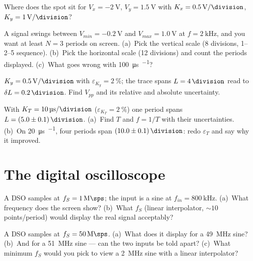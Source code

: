 \documentclass[11pt,a4paper,oneside]{book}
\begin{document}
\begin{exercise}
Where does the spot sit for $V_x=\qty{-2}{\volt}$, $V_y=\qty{1.5}{\volt}$ with
$K_x=\qty{0.5}{\volt\per\division}$, $K_y=\qty{1}{\volt\per\division}$?
\end{exercise}

\begin{exercise}
A signal swings between $V_{min}=\qty{-0.2}{\volt}$ and $V_{max}=\qty{1.0}{\volt}$
at $f=\qty{2}{\kilo\hertz}$, and you want at least $N=3$ periods on screen.
(a)~Pick the vertical scale (8 divisions, 1--2--5 sequence).
(b)~Pick the horizontal scale (12 divisions) and count the periods displayed.
(c)~What goes wrong with \qty{100}{\micro\second\per\division}?
\end{exercise}

\begin{exercise}
$K_y=\qty{0.5}{\volt\per\division}$ with $\varepsilon_{K_y}=\qty{2}{\percent}$;
the trace spans $L=\qty{4}{\division}$ read to $\delta L=\qty{0.2}{\division}$.
Find $V_{pp}$ and its relative and absolute uncertainty.
\end{exercise}

\begin{exercise}
With $K_T=\qty{10}{\micro\second\per\division}$
($\varepsilon_{K_T}=\qty{2}{\percent}$) one period spans
$L=(5.0\pm0.1)\,\unit{\division}$.
(a)~Find $T$ and $f=1/T$ with their uncertainties.
(b)~On \qty{20}{\micro\second\per\division}, four periods span
$(10.0\pm0.1)\,\unit{\division}$: redo $\varepsilon_T$ and say why it improved.
\end{exercise}

\chapter{The digital oscilloscope}

\begin{exercise}
A DSO samples at $f_S=\qty{1}{\mega\sps}$; the input is a sine at
$f_{in}=\qty{800}{\kilo\hertz}$.
(a)~What frequency does the screen show?
(b)~What $f_S$ (linear interpolator, ${\sim}10$ points/period) would display the
real signal acceptably?
\end{exercise}

\begin{exercise}
A DSO samples at $f_S=\qty{50}{\mega\sps}$.
(a)~What does it display for a \qty{49}{\mega\hertz} sine?
(b)~And for a \qty{51}{\mega\hertz} sine --- can the two inputs be told apart?
(c)~What minimum $f_S$ would you pick to view a \qty{2}{\mega\hertz} sine with a
linear interpolator?
\end{exercise}
\end{document}

